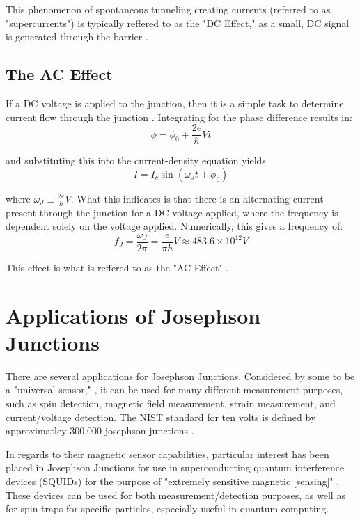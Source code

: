 \documentclass[letterpaper,english,reprint, aps]{revtex4-1}
\begin{document}
This phenomenon of spontaneous tunneling creating currents (referred to as "supercurrents") is typically reffered to as the "DC Effect," as a small, DC signal is generated through the barrier \citep{josephson,josephson_ieee,AC_detect,ac_dc_jj}.

\subsection{The AC Effect}
If a DC voltage is applied to the junction, then it is a simple task to determine current flow through the junction \citep{vanduzer}. Integrating for the phase difference results in:
\begin{equation}
    \phi = \phi_0 + \frac{2e}{\hbar}Vt
\end{equation}

and substituting this into the current-density equation yields
\begin{equation}
    I = I_c\sin(\omega_Jt+\phi_0)
\end{equation}

where $\omega_J \equiv \frac{2e}{\hbar}V$. What this indicates is that there is an alternating current present through the junction for a DC voltage applied, where the frequency is dependent solely on the voltage applied. Numerically, this gives a frequency of:
\begin{equation}
    f_J = \frac{\omega_J}{2\pi} = \frac{e}{\pi\hbar}V \approx 483.6\times10^{12}V
\end{equation}

This effect is what is reffered to as the "AC Effect" \citep{josephson, AC_He_jj, AC_detect, vanduzer, ac_dc_jj}. 
\section{Applications of Josephson Junctions}
There are several applications for Josephson Junctions. Considered by some to be a "universal sensor," \citep{josephson_ieee}, it can be used for many different measurement purposes, such as spin detection, magnetic field measurement, strain measurement, and current/voltage detection. The NIST standard for ten volts is defined by approximatley 300,000 josephson junctions \citep{nist,large_jj}.

In regards to their magnetic sensor capabilities, particular interest has been placed in Josephson Junctions for use in superconducting quantum interference devices (SQUIDs) for the purpose of "extremely sensitive magnetic [sensing]" \citep{jj_squid}. These devices can be used for both measurement/detection purposes, as well as for spin traps for specific particles, especially useful in quantum computing.
\end{document}
